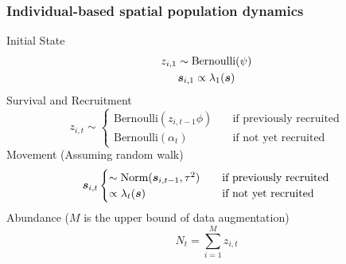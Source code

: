 \documentclass[color=usenames,dvipsnames]{beamer}\usepackage[]{graphicx}\usepackage[]{xcolor}
\begin{document}




\begin{frame}
  \frametitle{\Large Individual-based spatial population dynamics}
  {Initial State}
  \begin{gather*}
    z_{i,1} \sim \mbox{Bernoulli}(\psi) \\
    {\bm s}_{i,1} \propto \lambda_1({\bm s})
  \end{gather*}
  \vfill
  Survival and Recruitment
  \[
    z_{i,t} \sim
    \begin{cases}
      \mbox{Bernoulli}(z_{i,t-1}\phi) & \quad \text{if previously recruited} \\
      \mbox{Bernoulli}(\alpha_t) & \quad \text{if not yet recruited} 
    \end{cases}
  \]
  \vfill
  Movement (Assuming random walk)
  \[
    \bsit %
    \begin{cases}
      \sim \mbox{Norm}(\bsitp, \tau^2) & \quad \text{if previously recruited} \\
      \propto \lambda_t(\bs) & \quad \text{if not yet recruited} 
    \end{cases}
  \]
  \vfill
  Abundance ($M$ is the upper bound of data augmentation)
  \[
    N_t = \sum_{i=1}^M z_{i,t}
  \]
\end{frame}
\end{document}
